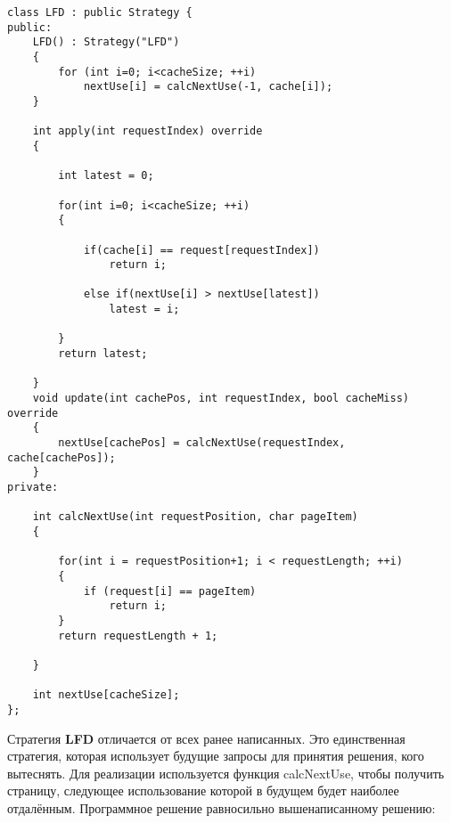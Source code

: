 \begin{tcolorbox}
\begin{verbatim}
class LFD : public Strategy {
public:
    LFD() : Strategy("LFD")
    {
        for (int i=0; i<cacheSize; ++i)
            nextUse[i] = calcNextUse(-1, cache[i]);
    }
    
    int apply(int requestIndex) override
    {
        
        int latest = 0;
        
        for(int i=0; i<cacheSize; ++i)
        {
        
            if(cache[i] == request[requestIndex])
                return i;
            
            else if(nextUse[i] > nextUse[latest])
                latest = i;
        
        }
        return latest;
    
    }
    void update(int cachePos, int requestIndex, bool cacheMiss) override
    {
        nextUse[cachePos] = calcNextUse(requestIndex, cache[cachePos]);
    }
private:

    int calcNextUse(int requestPosition, char pageItem)
    {
    
        for(int i = requestPosition+1; i < requestLength; ++i)
        {
            if (request[i] == pageItem)
                return i;
        }
        return requestLength + 1;
    
    }
    
    int nextUse[cacheSize];
};
\end{verbatim}
\end{tcolorbox}

Стратегия \textbf{LFD} отличается от всех ранее написанных. Это единственная стратегия, которая использует будущие запросы для принятия решения, кого вытеснять. Для реализации используется функция { calcNextUse}, чтобы получить страницу, следующее использование которой в будущем будет наиболее отдалённым. Программное решение равносильно вышенаписанному решению:

